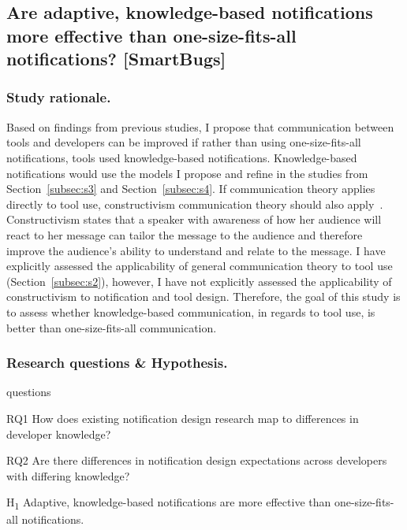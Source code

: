 \documentclass{llncs}
\begin{document}
\subsection{Are adaptive, knowledge-based notifications more effective than one-size-fits-all notifications? [SmartBugs]} \label{subsec:s5}
\subsubsection{Study rationale.}
Based on findings from previous studies, I propose that communication between tools and developers can be improved if rather than using one-size-fits-all notifications, tools used knowledge-based notifications. Knowledge-based notifications would use the models I propose and refine in the studies from Section~\ref{subsec:s3} and Section~\ref{subsec:s4}. If communication theory applies directly to tool use, constructivism communication theory should also apply~\cite{griffin2011first}. Constructivism states that a speaker with awareness of how her audience will react to her message can tailor the message to the audience and therefore improve the audience's ability to understand and relate to the message. 
I have explicitly assessed the applicability of general communication theory to tool use (Section~\ref{subsec:s2}), however, I have not explicitly assessed the applicability of constructivism to notification and tool design. Therefore, the goal of this study is to assess whether knowledge-based communication, in regards to tool use, is better than one-size-fits-all communication.

\subsubsection{Research questions \& Hypothesis.}

\begin{labeling}{questions}
	\item [RQ1] How does existing notification design research map to differences in developer knowledge?
	\item [RQ2] Are there differences in notification design expectations across developers with differing knowledge?
	\item [H\textsubscript{1}] Adaptive, knowledge-based notifications are more effective than one-size-fits-all notifications.
\end{labeling}
\end{document}
